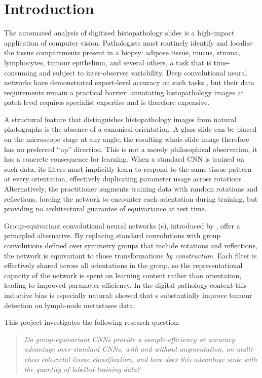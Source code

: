 \section{Introduction}
\label{sec:introduction}

The automated analysis of digitised histopathology slides is a high-impact application of
computer vision. Pathologists must routinely identify and localise the tissue compartments
present in a biopsy: adipose tissue, mucus, stroma, lymphocytes, tumour epithelium, and
several others, a task that is time-consuming and subject to inter-observer variability. Deep
convolutional neural networks have demonstrated expert-level accuracy on such tasks
\citep{kather2019predicting}, but their data requirements remain a practical barrier: annotating
histopathology images at patch level requires specialist expertise and is therefore expensive.

A structural feature that distinguishes histopathology images from natural photographs is the
absence of a canonical orientation. A glass slide can be placed on the microscope stage at any
angle; the resulting whole-slide image therefore has no preferred ``up'' direction. This is not
a merely philosophical observation, it has a concrete consequence for learning. When a
standard CNN is trained on such data, its filters must implicitly learn to respond to the same
tissue pattern at every orientation, effectively duplicating parameter usage across rotations
\citep{veeling2018rotation}. Alternatively, the practitioner augments training data with
random rotations and reflections, forcing the network to encounter each orientation during
training, but providing no architectural guarantee of equivariance at test time.

Group-equivariant convolutional neural networks (\gcnn{}s), introduced by
\citet{cohen2016group}, offer a principled alternative. By replacing standard convolutions
with group convolutions defined over symmetry groups that include rotations and reflections,
the network is equivariant to those transformations \emph{by construction}. Each filter is
effectively shared across all orientations in the group, so the representational capacity
of the network is spent on learning content rather than orientation, leading to improved
parameter efficiency. In the digital pathology context this inductive bias is especially
natural: \citet{veeling2018rotation} showed that \gcnn{}s substantially improve tumour
detection on lymph-node metastases data.

This project investigates the following research question:
\begin{quote}
  \emph{Do group-equivariant CNNs provide a sample-efficiency or accuracy advantage over
  standard CNNs, with and without augmentation, on multi-class colorectal tissue
  classification, and how does this advantage scale with the quantity of labelled training
  data?}
\end{quote}

